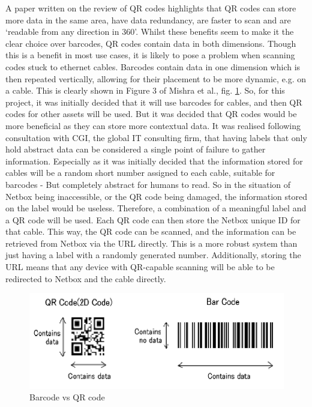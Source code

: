 \documentclass [11pt,a4paper]{article}
\begin{document}
A paper written on the review of QR codes highlights that QR codes can store more data in the same area, have data redundancy, are faster to scan and are `readable from any direction in 360\degree'\cite{mishra2017review}. Whilst these benefits seem to make it the clear choice over barcodes, QR codes contain data in both dimensions. Though this is a benefit in most use cases, it is likely to pose a problem when scanning codes stuck to ethernet cables. Barcodes contain data in one dimension which is then repeated vertically, allowing for their placement to be more dynamic, e.g. on a cable. This is clearly shown in Figure 3 of Mishra et al., fig. \ref{fig:barcode}. So, for this project, it was initially decided that it will use barcodes for cables, and then QR codes for other assets will be used. But it was decided that QR codes would be more beneficial as they can store more contextual data. It was realised following consultation with CGI, the global IT consulting firm, that having labels that only hold abstract data can be considered a single point of failure to gather information. Especially as it was initially decided that the information stored for cables will be a random short number assigned to each cable, suitable for barcodes - But completely abstract for humans to read. So in the situation of Netbox being inaccessible, or the QR code being damaged, the information stored on the label would be useless. Therefore, a combination of a meaningful label and a QR code will be used. Each QR code can then store the Netbox unique ID for that cable. This way, the QR code can be scanned, and the information can be retrieved from Netbox via the URL directly. This is a more robust system than just having a label with a randomly generated number. Additionally, storing the URL means that any device with QR-capable scanning will be able to be redirected to Netbox and the cable directly.

\begin{figure}[H]
\centering
\includegraphics[width=.40\textwidth]{images/barcode_mishra.png}
\caption{Barcode vs QR code}
\label{fig:barcode}
\end{figure}
\end{document}
